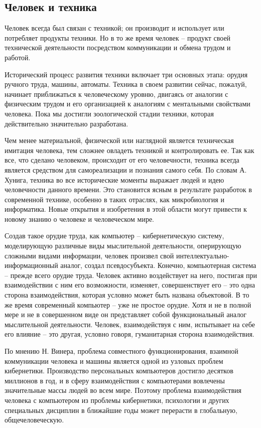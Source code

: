 \subsection{Человек и техника}

Человек всегда был связан с техникой; он производит и использует или 
потребляет продукты техники. Но в то же время человек -- продукт своей 
технической деятельности посредством коммуникации и обмена трудом и работой.

Исторический процесс развития техники включает три основных этапа: орудия 
ручного труда, машины, автоматы. Техника в своем развитии сейчас, пожалуй, 
начинает приближаться к человеческому уровню, двигаясь от аналогии с 
физическим трудом и его организацией к аналогиям с ментальными свойствами 
человека. Пока мы достигли зоологической стадии техники, которая 
действительно значительно разработана.

Чем менее материальной, физической или наглядной является техническая имитация 
человека, тем сложнее овладеть техникой и контролировать ее. Так как все, что 
сделано человеком, происходит от его человечности, техника всегда является 
средством для самореализации и познания самого себя. По словам А. Хунига, 
техника во все исторические моменты выражает людей и идею человечности данного 
времени. Это становится ясным в результате разработок в современной технике, 
особенно в таких отраслях, как микробиология и информатика. Новые открытия и 
изобретения в этой области могут привести к новому знанию о человеке и 
человеческом мире.

Создав такое орудие труда, как компьютер -- кибернетическую систему, 
моделирующую различные виды мыслительной деятельности, оперирующую сложными 
видами информации, человек произвел свой интеллектуально-
информационный аналог, создал псевдосубъекта. Конечно, компьютерная система -- 
прежде всего орудие труда. Человек активно воздействует на него, постигая при 
взаимодействии с ним его возможности, изменяет, совершенствует его -- это одна 
сторона взаимодействия, которая условно может быть названа объектовой. В то же 
время современный компьютер -- уже не простое орудие. Хотя и не в полной мере 
и не в совершенном виде он представляет собой функциональный аналог 
мыслительной деятельности. Человек, взаимодействуя с ним, испытывает на себе 
его влияние -- это другая, условно говоря, гуманитарная сторона взаимодействия.

По мнению Н. Винера, проблема совместного функционирования, взаимной 
коммуникации человека и машины является одной из узловых проблем кибернетики. 
Производство персональных компьютеров достигло десятков миллионов в год, и в 
сферу взаимодействия с компьютерами вовлечены значительные массы людей во всем 
мире. Поэтому проблема взаимодействия человека с компьютером из проблемы 
кибернетики, психологии и других специальных дисциплин в ближайшие годы может 
перерасти в глобальную, общечеловеческую.\cite{net:02}

